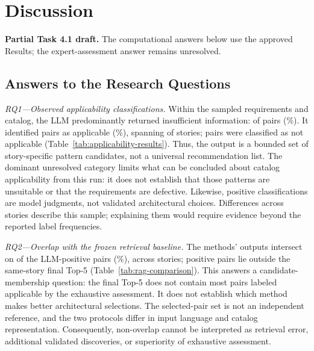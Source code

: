 \section{Discussion}
\label{sec:discussion}

\noindent\textbf{Partial Task 4.1 draft.} The computational answers below
use the approved Results; the expert-assessment answer remains unresolved.

\subsection{Answers to the Research Questions}

\emph{RQ1---Observed applicability classifications.}
Within the sampled requirements and catalog, the LLM predominantly
returned insufficient information: \StudyInsufficientInformationCount{}
of \StudyAssessmentCount{} pairs
(\RqOneInsufficientInformationPercent{}\%).
It identified \StudyApplicableCount{} pairs as applicable
(\RqOneApplicablePercent{}\%), spanning \StudyPositiveStoryCount{}
of \StudyStoryCount{} stories; \StudyNotApplicableCount{} pairs were
classified as not applicable (Table~\ref{tab:applicability-results}).
Thus, the output is a bounded set of story-specific pattern candidates,
not a universal recommendation list. The dominant unresolved category
limits what can be concluded about catalog applicability from this run:
it does not establish that those patterns are unsuitable or that the
requirements are defective. Likewise, positive classifications are model
judgments, not validated architectural choices. Differences across stories
describe this sample; explaining them would require evidence beyond the
reported label frequencies.

\emph{RQ2---Overlap with the frozen retrieval baseline.}
The methods' outputs intersect on \StudyRagOverlapCount{} of the
\StudyApplicableCount{} LLM-positive pairs
(\RqTwoOverlapPercent{}\%), across \StudyRagOverlapStoryCount{} stories;
\StudyRagOutsideCount{} positive pairs lie outside the same-story final
Top-5 (Table~\ref{tab:rag-comparison}).
This answers a candidate-membership question: the final Top-5 does not
contain most pairs labeled applicable by the exhaustive assessment.
It does not establish which method makes better architectural selections.
The selected-pair set is not an independent reference, and the two
protocols differ in input language and catalog representation.
Consequently, non-overlap cannot be interpreted as retrieval error,
additional validated discoveries, or superiority of exhaustive assessment.

